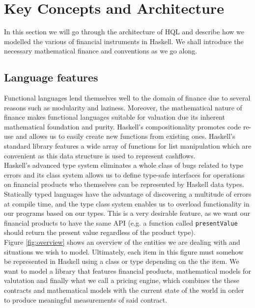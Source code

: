\chapter{Key Concepts and Architecture}

In this section we will go through the architecture of HQL and describe how we
modelled the various of financial instruments in Haskell. We shall introduce
the necessary mathematical finance and conventions as we go along.

\section{Language features}

Functional languages lend themselves well to the domain of finance due
to several reasons such as modularity\cite{hughes:matters-cj} and 
laziness\cite{composingcontracts}. Moreover, the mathematical nature
of finance makes functional languages suitable for valuation due its
inherent mathematical foundation and purity. Haskell's compositionality
promotes code re-use and allows us to easily create new functions from
existing ones. Haskell's standard library features a wide array of
functions for list manipulation which are convenient as this data structure
is used to represent cashflows.\\

Haskell's advanced type system eliminates a whole class of bugs related to 
type errors and its 
class system allows us to define type-safe interfaces for operations on 
financial products who themselves can be represented by Haskell data types. 
Statically typed languages have the advantage of discovering a multitude of
errors at compile time, and the type class system enables us to overload 
functionality in our programs based on our types. This is a very desirable
feature, as we want our financial products to have the same API (e.g. a function 
called \texttt{presentValue} should return the present value regardless of the
product type).\\

Figure \ref{fig:overview} shows an overview of the entities we are dealing with
and situations we wish to model. Ultimately, each item in this figure must somehow
be represented in Haskell using a class or type depending on the the item. We
want to model a library that features financial products, mathematical models
for valutation and finally what we call a pricing engine, which combines the 
these contracts and mathematical models with the current state of the world
in order to produce meaningful measurements of said contract.\\


